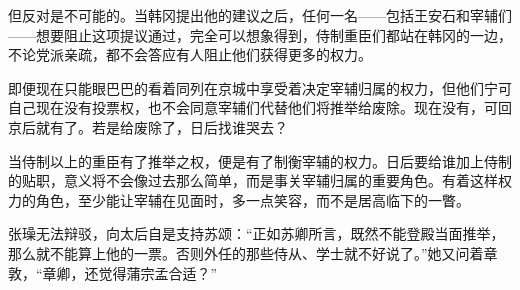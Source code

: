 但反对是不可能的。当韩冈提出他的建议之后，任何一名——包括王安石和宰辅们——想要阻止这项提议通过，完全可以想象得到，侍制重臣们都站在韩冈的一边，不论党派亲疏，都不会答应有人阻止他们获得更多的权力。

即便现在只能眼巴巴的看着同列在京城中享受着决定宰辅归属的权力，但他们宁可自己现在没有投票权，也不会同意宰辅们代替他们将推举给废除。现在没有，可回京后就有了。若是给废除了，日后找谁哭去？

当侍制以上的重臣有了推举之权，便是有了制衡宰辅的权力。日后要给谁加上侍制的贴职，意义将不会像过去那么简单，而是事关宰辅归属的重要角色。有着这样权力的角色，至少能让宰辅在见面时，多一点笑容，而不是居高临下的一瞥。

张璪无法辩驳，向太后自是支持苏颂：“正如苏卿所言，既然不能登殿当面推举，那么就不能算上他的一票。否则外任的那些侍从、学士就不好说了。”她又问着章敦，“章卿，还觉得蒲宗孟合适？”
